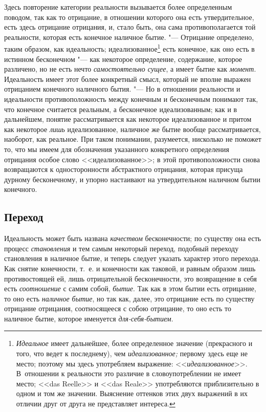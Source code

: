 Здесь повторение категории реальности вызывается более определенным поводом,
так как то отрицание, в отношении которого она есть утвердительное, есть
здесь отрицание отрицания, и, стало быть, она сама противополагается той
реальности, которая есть конечное наличное бытие. "--- Отрицание определено,
таким образом, как идеальность; идеализованное\footnote{{\em Идеальное}
имеет дальнейшее, более определенное значение (прекрасного и
того, что ведет к последнему), чем {\em идеализованное;} первому здесь еще
не место; поэтому мы здесь употребляем выражение: <<{\em идеализованное}>>.
В~отношении к реальности это различие в словоупотреблении не имеет место;
<<das Reelle>> и <<das Reale>> употребляются приблизительно в одном и том же
значении. Выяснение оттенков этих двух выражений в их отличии друг от друга
не представляет интереса.} есть конечное, как оно есть в истинном
бесконечном "--- как некоторое определение, содержание, которое различено, но
не есть нечто {\em самостоятельно сущее}, а имеет бытие
как {\em момент}. Идеальность имеет этот более
конкретный смысл, который не вполне выражен отрицанием конечного наличного
бытия. "--- Но в отношении реальности и идеальности противоположность между
конечным и бесконечным понимают так, что конечное считается реальным, а
бесконечное идеализованным; как и в дальнейшем, понятие рассматривается как
некоторое идеализованное и притом как некоторое
{\em лишь} идеализованное, наличное же бытие вообще
рассматривается, наоборот, как реальное. При таком понимании, разумеется,
нисколько не поможет то, что мы имеем для обозначения указанного
конкретного определения отрицания особое слово <<идеализованное>>; в этой
противоположности снова возвращаются к односторонности абстрактного
отрицания, которая присуща дурному бесконечному, и упорно настаивают на
утвердительном наличном бытии конечного.

\subsection[Переход]{Переход}

Идеальность может быть названа {\em качеством}
бесконечности; по существу она есть процесс
{\em становления} и тем самым некоторый переход,
подобный переходу становления в наличное бытие, и теперь следует указать
характер этого перехода. Как снятие конечности, т.~е. и конечности как
таковой, и равным образом лишь противостоящей ей, лишь отрицательной
бесконечности, это возвращение в себя есть {\em соотношение} с самим собой,
{\em бытие}. Так как в этом бытии есть отрицание, то
оно есть {\em наличное бытие}, но так как, далее, это отрицание есть
по существу отрицание отрицания, соотносящееся с собою отрицание, то
оно есть то наличное бытие, которое именуется {\em для-себя-бытием}.

